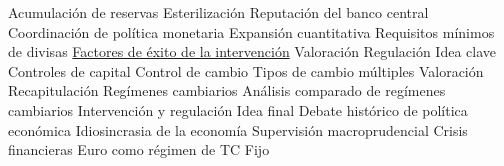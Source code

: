 \documentclass{nuevotema}
\begin{document}
\begin{esquema}[enumerate]
			\3 Acumulación de reservas
			\3 Esterilización
			\3 Reputación del banco central
			\3 Coordinación de política monetaria
			\3 Expansión cuantitativa
			\3 Requisitos mínimos de divisas
			\3 \underline{Factores de éxito de la intervención}
			\3 Valoración
		\2 Regulación
			\3 Idea clave
			\3 Controles de capital
			\3 Control de cambio
			\3 Tipos de cambio múltiples
			\3 Valoración
	\1[] 
		\2 Recapitulación
			\3 Regímenes cambiarios
			\3 Análisis comparado de regímenes cambiarios
			\3 Intervención y regulación
		\2 Idea final
			\3 Debate histórico de política económica
			\3 Idiosincrasia de la economía
			\3 Supervisión macroprudencial
			\3 Crisis financieras
			\3 Euro como régimen de TC Fijo

\end{esquema}

\esquemalargo
\end{document}
